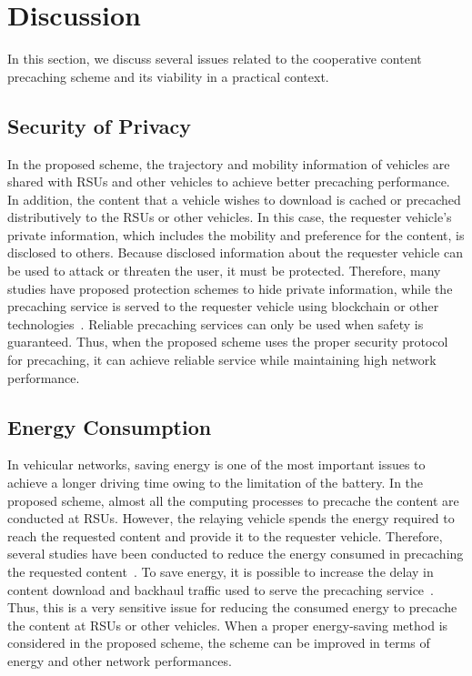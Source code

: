 \documentclass[electronics,aricle,accept,pdftex,moreauthors]{Definitions/mdpi}
\begin{document}
\section{Discussion} \label{sec.dis}
In this section, we discuss several issues related to the cooperative content precaching scheme and its viability in a practical context.

\subsection{Security of Privacy}
In the proposed scheme, the trajectory and mobility information of vehicles are shared with RSUs and other vehicles to achieve better precaching performance. In addition, the content that a vehicle wishes to download is cached or precached distributively to the RSUs or other vehicles. In this case, the requester vehicle’s private information, which includes the mobility and preference for the content, is disclosed to others. Because disclosed information about the requester vehicle can be used to attack or threaten the user, it must be protected. Therefore, many studies have proposed protection schemes to hide private information, while the precaching service is served to the requester vehicle using blockchain or other technologies~\cite{Yellanki2020Secu, Chai2019AHie}. Reliable precaching services can only be used when safety is guaranteed. Thus, when the proposed scheme uses the proper security protocol for precaching, it can achieve reliable service while maintaining high network performance.

\subsection{Energy Consumption}
In vehicular networks, saving energy is one of the most important issues to achieve a longer driving time owing to the limitation of the battery. In the proposed scheme, almost all the computing processes to precache the content are conducted at RSUs. However, the relaying vehicle spends the energy required to reach the requested content and provide it to the requester vehicle. Therefore, several studies have been conducted to reduce the energy consumed in precaching the requested content~\cite{Tran2017Mobe, Shen2020ABlo, Ahani2018OnOp, Dong2020APro}.
To save energy, it is possible to increase the delay in content download and backhaul traffic used to serve the precaching service~\cite{Shen2020ABlo}.
Thus, this is a very sensitive issue for reducing the consumed energy to precache the content at RSUs or other vehicles. When a proper energy-saving method is considered in the proposed scheme, the scheme can be improved in terms of energy and other network performances.
\end{document}
